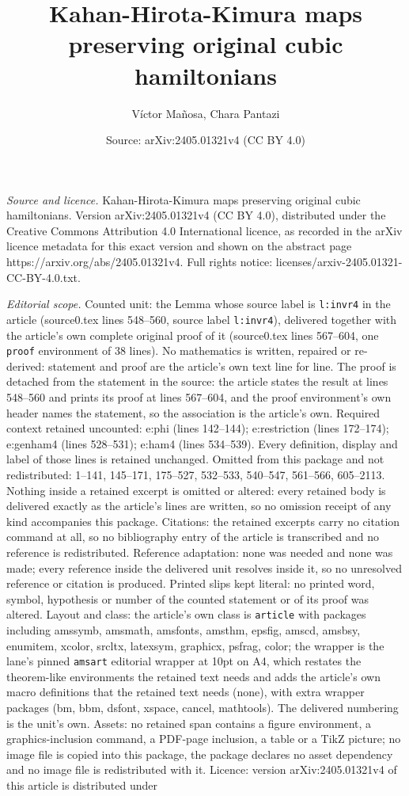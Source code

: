 \documentclass[10pt,a4paper]{amsart}
\title[Kahan-Hirota-Kimura maps preserving original cubic hamiltoni]{Kahan-Hirota-Kimura maps preserving original cubic hamiltonians}
\author{V\'ictor Ma\~nosa, Chara Pantazi}
\date{Source: arXiv:2405.01321v4 (CC BY 4.0)}
\begin{document}
\maketitle

\noindent\emph{Source and licence.} Kahan-Hirota-Kimura maps preserving original cubic hamiltonians. Version arXiv:2405.01321v4 (CC BY 4.0), distributed under the Creative Commons Attribution 4.0 International licence, as recorded in the arXiv licence metadata for this exact version and shown on the abstract page https://arxiv.org/abs/2405.01321v4. Full rights notice: licenses/arxiv-2405.01321-CC-BY-4.0.txt.\par\smallskip

\noindent\textit{Editorial scope.} Counted unit: the Lemma whose source label is \texttt{l:invr4} in the article (source0.tex lines 548--560, source label \texttt{l:invr4}), delivered together with the article's own complete original proof of it (source0.tex lines 567--604, one \texttt{proof} environment of 38 lines). No mathematics is written, repaired or re-derived: statement and proof are the article's own text line for line. The proof is detached from the statement in the source: the article states the result at lines 548--560 and prints its proof at lines 567--604, and the proof environment's own header names the statement, so the association is the article's own. Required context retained uncounted: e:phi (lines 142--144); e:restriction (lines 172--174); e:genham4 (lines 528--531); e:ham4 (lines 534--539). Every definition, display and label of those lines is retained unchanged. Omitted from this package and not redistributed: 1--141, 145--171, 175--527, 532--533, 540--547, 561--566, 605--2113. Nothing inside a retained excerpt is omitted or altered: every retained body is delivered exactly as the article's lines are written, so no omission receipt of any kind accompanies this package. Citations: the retained excerpts carry no citation command at all, so no bibliography entry of the article is transcribed and no reference is redistributed. Reference adaptation: none was needed and none was made; every reference inside the delivered unit resolves inside it, so no unresolved reference or citation is produced. Printed slips kept literal: no printed word, symbol, hypothesis or number of the counted statement or of its proof was altered. Layout and class: the article's own class is \texttt{article} with packages including amssymb, amsmath, amsfonts, amsthm, epsfig, amscd, amsbsy, enumitem, xcolor, srcltx, latexsym, graphicx, psfrag, color; the wrapper is the lane's pinned \texttt{amsart} editorial wrapper at 10pt on A4, which restates the theorem-like environments the retained text needs and adds the article's own macro definitions that the retained text needs (none), with extra wrapper packages (bm, bbm, dsfont, xspace, cancel, mathtools). The delivered numbering is the unit's own. Assets: no retained span contains a figure environment, a graphics-inclusion command, a PDF-page inclusion, a table or a TikZ picture; no image file is copied into this package, the package declares no asset dependency and no image file is redistributed with it. Licence: version arXiv:2405.01321v4 of this article is distributed under 
\end{document}
